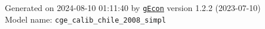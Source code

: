 \documentclass[10pt,a4paper]{article}
\numberwithin{equation}{section}
\begin{document}
\begin{landscape}
\begin{flushleft}{\large
Generated  on 2024-08-10 01:11:40 by \href{http://gecon.r-forge.r-project.org/}{\texttt{gEcon}} version 1.2.2 (2023-07-10)\\
Model name: \verb+cge_calib_chile_2008_simpl+
}\end{flushleft}


\end{landscape}

\end{document}

